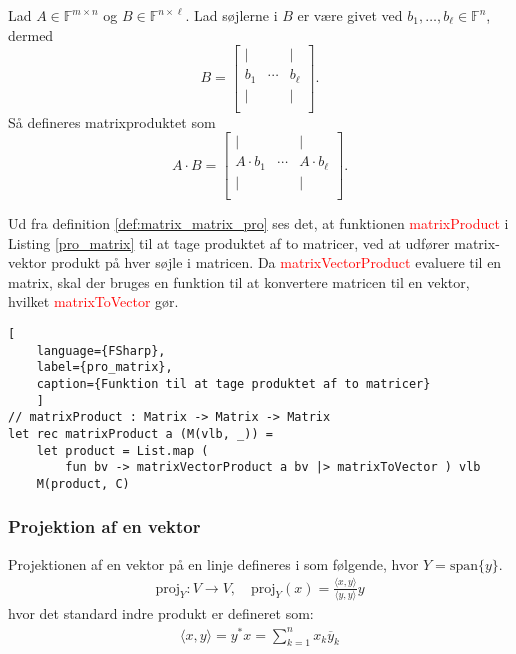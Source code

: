 \begin{definition}\label{def:matrix_matrix_pro}
    Lad $A \in \mathbb{F}^{m \times n}$ og $B \in \mathbb{F}^{n \times \ell}$. Lad søjlerne i $B$ er være givet ved $b_1, \ldots, b_\ell \in \mathbb{F}^n$, dermed
    \[
        B = \begin{bmatrix}
    | &  & | \\
    b_1 & \cdots & b_\ell \\
    | &  & | \\
\end{bmatrix}.
\]
Så defineres matrixproduktet som
\[
    A \cdot B = \begin{bmatrix}
        | &  & | \\
        A \cdot b_1 & \cdots & A \cdot b_\ell \\
        | &  & | \\
    \end{bmatrix}.
    \]
\end{definition}
Ud fra definition \ref{def:matrix_matrix_pro} ses det, at funktionen \textcolor{red}{matrixProduct} i Listing \ref{pro_matrix} til at tage produktet af to matricer, ved at udfører matrix-vektor produkt på hver søjle i matricen. Da \textcolor{red}{matrixVectorProduct} evaluere til en matrix, skal der bruges en funktion til at konvertere matricen til en vektor, hvilket \textcolor{red}{matrixToVector} gør.
\begin{lstlisting}[
    language={FSharp}, 
    label={pro_matrix}, 
    caption={Funktion til at tage produktet af to matricer}
    ]
// matrixProduct : Matrix -> Matrix -> Matrix
let rec matrixProduct a (M(vlb, _)) =
    let product = List.map (
        fun bv -> matrixVectorProduct a bv |> matrixToVector ) vlb
    M(product, C)
\end{lstlisting}
        
\subsubsection{Projektion af en vektor}

\begin{definition}\label{def:proj}
Projektionen af en vektor på en linje defineres i som følgende, hvor $Y = \text{span}\{y\}$.
\begin{align}
    \text{proj}_Y : V \rightarrow V, \quad \text{proj}_Y(x) = \frac{\langle x, y \rangle}{\langle y, y \rangle} y
\end{align}
hvor det standard indre produkt er defineret som:
\begin{align}
    \langle x, y \rangle = y^* x = \sum_{k=1}^{n} x_k \overline{y}_k
\end{align}
\end{definition}
    

